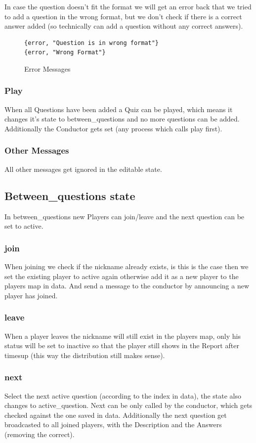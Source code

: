 \documentclass[12pt,a4paper]{article}
\begin{document}
In case the question doesn't fit the format we will get an error back that we tried to add a question in the wrong format, but we don't check if there is a correct answer added (so technically can add a question without any correct answers).
\begin{figure}
\begin{verbatim}
{error, "Question is in wrong format"}
{error, "Wrong Format"}
\end{verbatim}
\caption{Error Messages}
\end{figure}

\subsubsection{Play}
When all Questions have been added a Quiz can be played, which means it changes it's state to between\_questions and no more questions can be added.
Additionally the Conductor gets set (any process which calls play first).

\subsubsection{Other Messages}
All other messages get ignored in the editable state.

\subsection{Between\_questions state}
In between\_questions new Players can join/leave and the next question can be set to active.

\subsubsection{join}
When joining we check if the nickname already exists, is this is the case then we set the existing player to active again otherwise add it as a new player to the players map in data.
And send a message to the conductor by announcing a new player has joined.

\subsubsection{leave}
When a player leaves the nickname will still exist in the players map, only his status will be set to inactive so that the player still shows in the Report after timesup (this way the distribution still makes sense).

\subsubsection{next}
Select the next active question (according to the index in data), the state also changes to active\_question.
Next can be only called by the conductor, which gets checked against the one saved in data.
Additionally the next question get broadcasted to all joined players, with the Description and the Answers (removing the correct).
\end{document}
